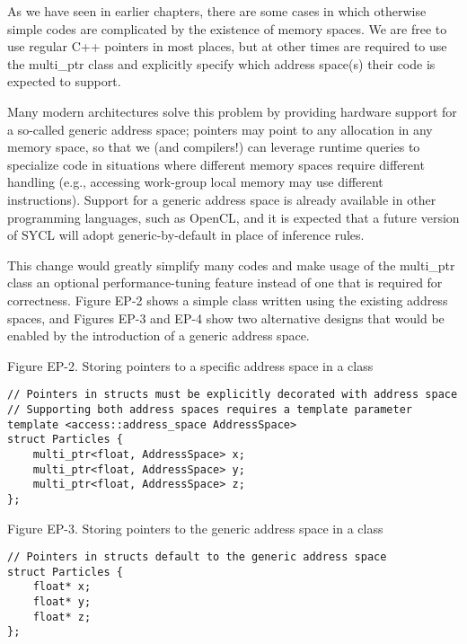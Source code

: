 As we have seen in earlier chapters, there are some cases in which otherwise simple codes are complicated by the existence of memory spaces. We are free to use regular C++ pointers in most places, but at other times are required to use the multi\_ptr class and explicitly specify which address space(s) their code is expected to support.\par

Many modern architectures solve this problem by providing hardware support for a so-called generic address space; pointers may point to any allocation in any memory space, so that we (and compilers!) can leverage runtime queries to specialize code in situations where different memory spaces require different handling (e.g., accessing work-group local memory may use different instructions). Support for a generic address space is already available in other programming languages, such as OpenCL, and it is expected that a future version of SYCL will adopt generic-by-default in place of inference rules.\par

This change would greatly simplify many codes and make usage of the multi\_ptr class an optional performance-tuning feature instead of one that is required for correctness. Figure EP-2 shows a simple class written using the existing address spaces, and Figures EP-3 and EP-4 show two alternative designs that would be enabled by the introduction of a generic address space.\par

\hspace*{\fill} \par %
Figure EP-2. Storing pointers to a specific address space in a class
\begin{lstlisting}[caption={}]
// Pointers in structs must be explicitly decorated with address space
// Supporting both address spaces requires a template parameter
template <access::address_space AddressSpace>
struct Particles {
	multi_ptr<float, AddressSpace> x;
	multi_ptr<float, AddressSpace> y;
	multi_ptr<float, AddressSpace> z;
};
\end{lstlisting}

\hspace*{\fill} \par %
Figure EP-3. Storing pointers to the generic address space in a class
\begin{lstlisting}[caption={}]
// Pointers in structs default to the generic address space
struct Particles {
	float* x;
	float* y;
	float* z;
};
\end{lstlisting}

